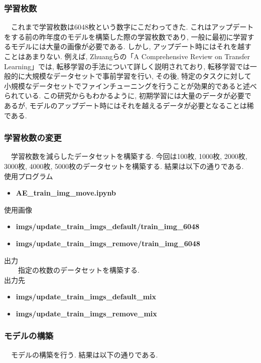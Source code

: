 \documentclass[a4paper, 12pt]{report}
\begin{document}
\subsubsection{学習枚数}
　これまで学習枚数は6048枚という数字にこだわってきた. これはアップデートをする前の昨年度のモデルを構築した際の学習枚数であり, 一般に最初に学習するモデルには大量の画像が必要である. しかし, アップデート時にはそれを越すことはあまりない. 
例えば, Zhuangらの「A Comprehensive Review on Transfer Learning」\cite{zhuang2020comprehensive}では, 転移学習の手法について詳しく説明されており, 転移学習では一般的に大規模なデータセットで事前学習を行い, その後, 特定のタスクに対して小規模なデータセットでファインチューニングを行うことが効果的であると述べられている. 
この研究からもわかるように, 初期学習には大量のデータが必要であるが, モデルのアップデート時にはそれを越えるデータが必要となることは稀である. 

\subsubsection{学習枚数の変更}
　学習枚数を減らしたデータセットを構築する. 今回は100枚, 1000枚, 2000枚, 3000枚, 4000枚, 5000枚のデータセットを構築する. 結果は以下の通りである. \\

使用プログラム
\begin{itemize}
    \item \textbf{AE\_train\_img\_move.ipynb}
\end{itemize}

使用画像
\begin{itemize}
    \item \textbf{imgs/update\_train\_imgs\_default/train\_img\_6048}
    \item \textbf{imgs/update\_train\_imgs\_remove/train\_img\_6048}
\end{itemize}

出力\\
　　指定の枚数のデータセットを構築する. \\

出力先\\
\begin{itemize}
    \item \textbf{imgs/update\_train\_imgs\_default\_mix}
    \item \textbf{imgs/update\_train\_imgs\_remove\_mix}
\end{itemize}

\subsubsection{モデルの構築}
　モデルの構築を行う. 結果は以下の通りである. \\
\end{document}
